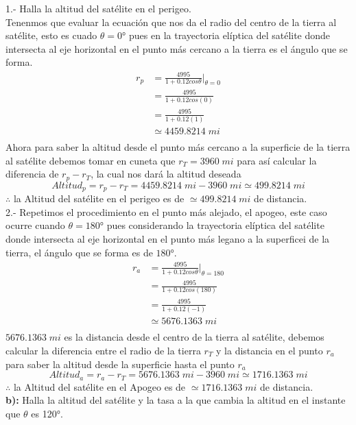  1.-  Halla la altitud del satélite en el perigeo.\\
Tenenmos que evaluar la ecuación que nos da el radio del centro de la tierra al satélite, esto es cuado $\theta = 0$° pues en la trayectoria elíptica del satélite donde intersecta al eje horizontal en el punto más cercano a la tierra es el ángulo que se forma.
\begin{align*}
	r_{p} & =\frac{4995}{1+0.12cos\theta} \bigg|_{\theta=0} \\
	      & =\frac{4995}{1+0.12cos(0)}                      \\
	      & =\frac{4995}{1+0.12(1)}                         \\
	      & \simeq 4459.8214 \;mi                           \\
\end{align*}
Ahora para saber la altitud desde el punto más cercano a la superficie de la tierra al satélite debemos tomar en cuneta que $r_T=3960 \;mi$ para así calcular la diferencia de $r_p-r_T$, la cual nos dará la altitud deseada $$Altitud_p=r_p-r_T=4459.8214 \;mi-3960 \;mi\simeq 499.8214\;mi$$
$\therefore$ la Altitud del satélite en el perigeo es de $\simeq 499.8214\;mi$ de distancia.\\
2.- Repetimos el procedimiento en el punto más alejado, el apogeo, este caso ocurre cuando $\theta = 180$° pues considerando la trayectoria elíptica del satélite donde intersecta al eje horizontal en el punto más legano a la superficei de la tierra, el ángulo que se forma es de $180$°.
\begin{align*}
	r_{a} & =\frac{4995}{1+0.12cos\theta} \bigg|_{\theta=180} \\
	      & =\frac{4995}{1+0.12cos(180)}                      \\
	      & =\frac{4995}{1+0.12(-1)}                          \\
	      & \simeq 5676.1363 \;mi                             \\
\end{align*}
$5676.1363 \;mi$ es la distancia desde el centro de la tierra al satélite, debemos calcular la diferencia entre el radio de la tierra $r_T$ y la distancia en el punto $r_a$ para saber la altitud desde la superficie hasta el punto $r_a$$$Altitud_a = r_a-r_T=5676.1363 \;mi-3960\;mi\simeq 1716.1363 \;mi$$
$\therefore$ la Altitud del satélite en el Apogeo es de $\simeq 1716.1363 \;mi$ de distancia.\\
\textbf{b):} Halla la altitud del satélite y la tasa a la que cambia la altitud en el instante que $\theta$ es 120°.
